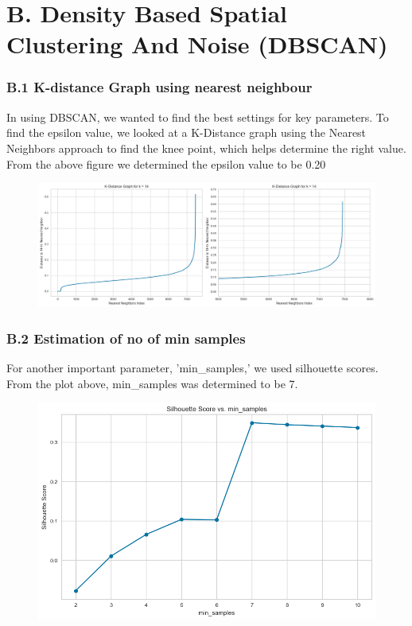 \documentclass{article}
\begin{document}
\section*{B. Density Based Spatial Clustering And Noise (DBSCAN)}

\label{app:DBSCAN}
\subsubsection*{B.1 K-distance Graph using nearest neighbour}
In using DBSCAN, we wanted to find the best settings for key parameters. To find the epsilon value, we looked at a K-Distance graph using the Nearest Neighbors approach to find the knee point, which helps determine the right value. From the above figure we determined the epsilon value to be 0.20
\label{app:kDist graph}
\begin{figure}[H]
    \centering
    \includegraphics[width=0.8\linewidth]{Images/KL DIVERGANVE AND KNEE PLLOT.png}
\end{figure}



\subsubsection*{B.2 Estimation of no of min samples}
For another important parameter, 'min\_samples,' we used silhouette scores. From the plot above, min\_samples was determined to be 7.
\label{app:min_samples}
\begin{figure}[H]
    \centering
    \includegraphics[width=0.7\linewidth]{Images/dbscan scores.png}
\end{figure}
\end{document}
